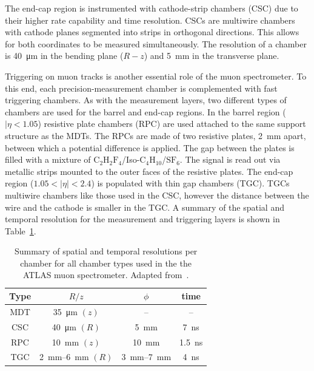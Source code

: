 The end-cap region is instrumented with cathode-strip chambers (CSC) due to their higher rate capability and time resolution. CSCs are multiwire chambers with cathode planes segmented into strips in orthogonal directions. This allows for both coordinates to be measured simultaneously. The resolution of a chamber is \SI{40}{\um} in the bending plane ($R-z$) and \SI{5}{\mm} in the transverse plane.

Triggering on muon tracks is another essential role of the muon spectrometer. To this end, each precision-measurement chamber is complemented with fast triggering chambers. As with the measurement layers, two different types of chambers are used for the barrel and end-cap regions. In the barrel region ($|\eta<1.05$) resistive plate chambers (RPC) are used attached to the same support structure as the MDTs. The RPCs are made of two resistive plates, \SI{2}{\mm} apart, between which a potential difference is applied. The gap between the plates is filled with a mixture of $\textrm{C}_2\textrm{H}_2\textrm{F}_4$/Iso-$\textrm{C}_4\textrm{H}_{10}$/$\textrm{SF}_6$. The signal is read out via metallic strips mounted to the outer faces of the resistive plates. The end-cap region ($1.05<|\eta|<2.4$) is populated with thin gap chambers (TGC). TGCs multiwire chambers like those used in the CSC, however the distance between the wire and the cathode is smaller in the TGC. A summary of the spatial and temporal resolution for the measurement and triggering layers is shown in Table~\ref{tab:MSPerfomanceSummary}.
%
\begin{table}
  \centering
  \begin{tabular}{|c|c|c|c|}
   \hline
   Type & $R/z$ & $\phi$ & time \\
   \hline
   MDT & \SI{35}{\um} $(z)$ & -- & -- \\
   CSC & \SI{40}{\um} $(R)$ & \SI{5}{\mm} & \SI{7}{\ns} \\
   RPC & \SI{10}{\mm} $(z)$ & \SI{10}{\mm} & \SI{1.5}{\ns} \\ 
   TGC & \SIrange[range-phrase=-,range-units=single]{2}{6}{\mm} $(R)$ & \SIrange[range-phrase=-,range-units=single]{3}{7}{\mm} & \SI{4}{\ns} \\
   \hline
  \end{tabular}
  \caption{Summary of spatial and temporal resolutions per chamber for all chamber types used in the the ATLAS muon spectrometer. Adapted from~\cite{Detector:ATLASExperimentGeneral}.}
  \label{tab:MSPerfomanceSummary}
\end{table}


